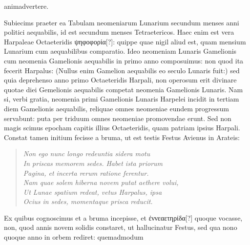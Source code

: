 animadvertere.
%
\begin{table}[htb]
 
\end{table}
%
\begin{table}[htb]
 
\end{table}
%
Subiecims praeter ea Tabulam neomeniarum Lunarium secundum
menses anni politici aequabilis, id est secundum menses Tetraetericos.
Haec enim est vera Harpaleae Octaeteridis \textgreek{ψηφοφορία[?]}:
 quippe
quae nigil aliud est, quam mensium Lunarium cum aequabilibus
comparatio.
Ideo neomeniam Lunaris Gamelionis cum neomenia
Gamelionis aequabilis in primo anno composuimus: non quod
ita fecerit Harpalus: (Nullus enim Gamelion aequabilis eo seculo
Lunaris fuit:) sed quia deprehenso anno primo Octaeteridis Harpali,
non operosum erit divinare quotae diei Gemelionis aequabilis
competat neomenia Gamelionis Lunaris.
Nam si, verbi gratia,
neomenia primi Gamelionis Lunaris Harpelei incidit in tertiam
diem Gamelionis aequabilis, reliquae omnes neomeniae eundem progressum
servabunt: puta per triduum omnes neomeniae promovendae
erunt.
Sed non magis scimus epocham capitis illius Octaeteridis,
quam patriam ipsius Harpali.
Constat tamen initium fecisse a bruma,
ut est testis Festus Avienus in Arateis:
\begin{verse}
\textit{Non ego nunc longo redeuntia sidera motu\\
In priscas memorem sedes. Habet ista priorum\\
Pagina, et incerta rerum ratione ferentur.\\
Nam quae solem hiberna novem putat aethere volui,\\
Ut Lunae spatium redeat, vetus Harpalus, ipsa\\
Ocius in sedes, momentaque prisca reducit.}
\end{verse}
Ex quibus cognoscimus et a bruma incepisse,
 et \textgreek{ἐννεαετηρίδα[?]} quoque
vocasse, non, quod annis novem solidis constaret, ut hallucinatur
Festus, sed qua nono quoque anno in orbem rediret: quemadmodum
